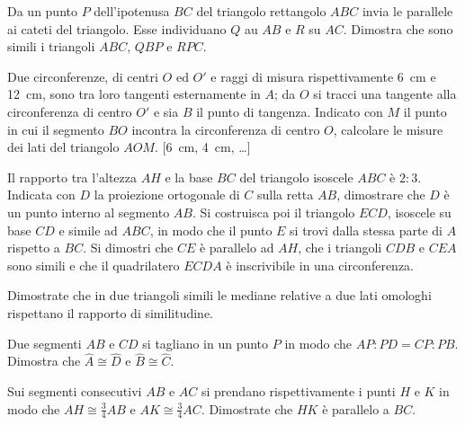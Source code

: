 \begin{multicols}{2}
\begin{esercizio}
\label{ese:6.71}
Da un punto $P$ dell'ipotenusa $BC$ del triangolo rettangolo $ABC$ invia le parallele ai cateti del triangolo. Esse individuano $Q$ au $AB$ e $R$ su $AC$. Dimostra che sono simili i triangoli $ABC$, $QBP$ e $RPC$.
\end{esercizio}

\begin{esercizio}
\label{ese:6.72}
Due circonferenze, di centri $O$ ed $O'$ e raggi di misura rispettivamente 6~cm e 12~cm, sono tra loro tangenti esternamente in $A$; da $O$ si tracci una tangente alla circonferenza di centro $O'$ e sia $B$ il punto di tangenza. Indicato con $M$ il punto in cui il segmento $BO$ incontra la circonferenza di centro $O$, calcolare le misure dei lati del triangolo $AOM$. [6~cm, 4~cm, \ldots{}]
\end{esercizio}

\begin{esercizio}
\label{ese:6.73}
Il rapporto tra l'altezza $AH$ e la base $BC$ del triangolo isoscele $ABC$ è $2:3$. Indicata con $D$ la proiezione ortogonale di $C$ sulla retta $AB$, dimostrare che $D$ è un punto interno al segmento $AB$. Si costruisca poi il triangolo $ECD$, isoscele su base $CD$ e simile ad $ABC$, in modo che il punto $E$ si trovi dalla stessa parte di $A$ rispetto a $BC$. Si dimostri che $CE$ è parallelo ad $AH$, che i triangoli $CDB$ e $CEA$ sono simili e che il quadrilatero $ECDA$ è inscrivibile in una circonferenza.
\end{esercizio}

\begin{esercizio}
\label{ese:6.74}
Dimostrate che in due triangoli simili le mediane relative a due lati omologhi rispettano il rapporto di similitudine.
\end{esercizio}

\begin{esercizio}
\label{ese:6.75}
Due segmenti $AB$ e $CD$ si tagliano in un punto $P$ in modo che $AP:PD=CP:PB$. Dimostra che $\widehat{A}\cong \widehat{D}$ e $\widehat{B}\cong \widehat{C}$.
\end{esercizio}

\begin{esercizio}
\label{ese:6.76}
Sui segmenti consecutivi $AB$ e $AC$ si prendano rispettivamente i punti $H$ e $K$ in modo che $AH\cong \frac{3}{4}AB$ e $AK\cong \frac{3}{4}AC$. Dimostrate che $HK$ è parallelo a $BC$.
\end{esercizio}


\end{multicols}
